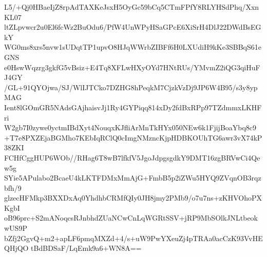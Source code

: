 L5/+Qj0HBaeIjZ8rpAdTAXKeJsxH5OyGc59bCq5CTmFPfY8RLYHSdPhq/XxnKL07
ltZLpvwcr2u0El6fcWz2BuOdu6/PfW4UnWPyHSaGPcE6XiSrH4DlJ22DWdBsEGkY
WG0ms8xrs5nvw1sUDqtTP1upvO8HJqWWrbZIBFf6H0LXUdiH9kKe3SBBqS61eGNS
e0HswWqzrg3gkfG5vBsiz+E4Tq8XFLwHXyOYd7HNtRUs/YMvmZ2iQG3qiHuFJ4GY
/GL+91QYOjwa/SJ/WlIJTCko7DZHG8hPeqkM7CjzkVzDj9JP6W4B95/s3y8ypMAG
Ient8lGOmGR5NAdsGAjhaisvJj1Ry4GYPiqq814xDy2fdBxRPp97TZdmmxLKHFri
W2gb7I0zywe0yctmIBdXyt4NouqxKJfliArMnTkHYx050NEw6k1FjijBoaYbq8c9
+T7e8PXZEjaBGMho7KEbIqRClQ0cImgNMzncKjpHDBKOUhTG6awr3vX74kP38ZKI
FCHfCggHUP6WOb//RHag6T8wB7lfkfV5JgoJdpgsgdkY9DMT16zgBRVwCi4Qew5g
SYie5APulabo2BcaeU4kLKTFDMxMmAjG+FmbB5p2iZWu5HYQ9ZVqnOB3rqzbfh/9
glzecHFMkp3BXXDxAq0YhdhbCRMfQIy0JH8jmy2PMb9/o7u7ns+zKHVOhoPXKgbI
oB96prc+S2mANoqcsRJnbhdZUaNCwCnLqWGRtSSV+jRP9MbSOlkJNLtbeokwUS9P
bZfj2GgvQ+m2+apLF6pmqMXZd+4/s+uW9PwYXeuZj4pTRAa0acCzK93VvHEQHjQO
tBdBDSaF/LqEmk9a6+WN8A==

